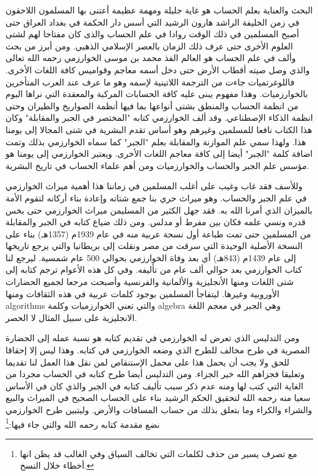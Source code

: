 البحث والعناية بعلم الحساب هو غاية جليلة ومهمة عظيمة أعتنى بها المسلمون اللاحقون في زمن الخليفة الراشد هارون الرشيد التي أسس دار الحكمة في بغداد العراق حتى أصبح المسلمين في ذلك الوقت روادا في علم الحساب والذى كان مفتاحا لهم لشتى العلوم الأخرى حتى عرف ذلك الزمان بالعصر الإسلامي الذهبي. ومن أبرز من بحث وألف في علم الحساب هو العالم الفذ محمد بن موسى الخوارزمي رحمه الله تعالى والذي وصل صيته أقطاب الأرض حتى دخل أسمه معاجم وقواميس كافة اللغات الأخرى. فاللوغرتميات جاءت من الترجمة اللاتينية لإسمه وهو ما عرف عند العرب المتأخرين بالخوارزميات. وهذا مفهوم يبنى عليه كافة الحسابات المركبة والمعقدة التي نراها اليوم من انظمة الحساب والمنطق بشتى أنواعها بما فيها أنظمة الصواريخ والطيران وحتى انظمة الذكاء الإصطناعي. وقد ألف الخوارزمي كتابه "المختصر في الجبر والمقابلة" وكان هذا الكتاب نافعا للمسلمين وغيرهم وهو أساس تقدم البشرية في شتى المجالا إلى يومنا هذا. ولهذا سمي علم الموازنة والمقابلة بعلم "الجبر" كما سماه الخوارزمي بذلك وتمت اضافة كلمة "الجبر" أيضا إلى كافة معاجم اللغات الأخرى. ويعتبر الخوارزمي إلى يومنا هو مؤسس علم الجبر والحساب والخوارزميات ومن أهم علماء الحساب في تاريخ البشرية.

وللأسف فقد غاب وغيب على أغلب المسلمين في زماننا هذا أهمية ميراث الخوارزمي في علم الجبر والحساب. وهو ميراث حري بنا جمع شتاته وإعادة بناء أركانه لتقوم الأمة بالميزان الذي أمرنا الله به. فقد جهل الكثير من المسليمن ميراث الخوارزمي حتى بخس قدره ونسي علمه فكان بين مفرط أو مدلس. ومن ذلك ضياع كتابه في الجبر والمقابلة من المسلمين حتى تمت طباعة أول نسحة عربية منه في عام 1939م (1357هـ) بناء على النسخة الأصلية الوحيدة التي سرقت من مصر ونقلت إلى بريطانيا والتي يرجع تاريخها إلى عام 1439م (843هـ) أي بعد وفاة الخوارزمي بحوالي 500 عام شمسية.
ليرجع لنا كتاب الخوارزمي بعد حوالي ألف عام من تأليفه.
وفي كل هذه الأعوام ترجم كتابه إلى شتى اللغات ومنها الأنجليزية والألمانية والفرنسية وأصبحت مرجعا لجميع الحضارات الأوروبية وغيرها.
ليتفاجأ المسلمين بوجود كلمات عربية في هذه الثقافات ومنها algorithms والتي تعني الخوارزميات وكلمة algebra وهي الجبر في معجم اللغة الانجليزية على سبيل المثال لا الحصر.

ومن التدليس الذي تعرض له الخوارزمي في تقديم كتابه هو نسبة عمله إلى الحضارة المصرية في طرح مخالف للطرح الذي وضعه الخوارزمي في كتابه. وهذا ليس إلا إحقاقا للحق ولا يجب أن يحمل هذا على محمل الإستنقاص لمن نقل هذا العمل لنا تقديما وتعليقا فجزاهم الله خير الجزاء. ومن التدليس أيضا طرح كتابه في الحساب مجردا من الغاية التي كتب لها ومنه عدم ذكر سبب تأليف كتابه في الجبر والذي كان في الأساس سعيا منه رحمه الله لتحقيق الحكم الرشيد بناء على الحساب الصحيح في الميراث والبيع والشراء والكراء وما بتعلق بذلك من حساب المسافات والأرض. وليتبين طرح الخوارزمي نضع مقدمة كتابه رحمه الله والتي جاء فيها:\footnote{مع تصرف يسير من حذف لكلمات التي تخالف السياق وفي الغالب قد يظن انها أخطاء خلال النسخ.}

